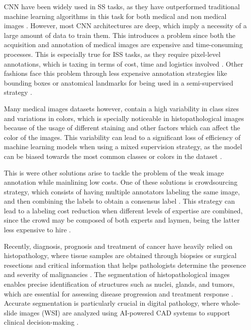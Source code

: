 \gls{CNN} have been widely used in \gls{SS} tasks, as they have outperformed
traditional machine learning algorithms in this task for both medical
and non medical images \cite{XuYan2024} \cite{Sarvamangala2022}.
However, most \gls{CNN} architectures are deep, which imply
a necessity of a large amount of data to train them. This introduces
a problem since both the acquisition and annotation of medical images
are expensive and time-consuming processes. This is especially true
for \gls{ISS} tasks, as they require pixel-level annotations, which
is taxing in terms of cost, time and logistics involved
\cite{Bhalgat2018}. Other fashions face this problem through less expensive
annotation strategies like bounding boxes or anatomical landmarks for
being used in a semi-supervised strategy \cite{Shah2018}.


Many medical images datasets however, contain a high variability in
class sizes and variations in colors, which is specially noticeable
in histopathological images because of the usage of different
staining and other factors which can affect the color of the images.
This variability can lead to a significant loss of efficiency of
machine learning models when using a mixed supervision strategy, as
the model can be biased towards the most common classes or colors in
the dataset \cite{Shah2018}.

This is were other solutions arise to tackle the problem of the weak
image annotation while mainlining low costs. One of these solutions
is crowdsourcing strategy, which consists of having multiple annotators
labeling the same image, and then combining the labels to obtain a
consensus label \cite{LuEtAl2023}. This strategy can lead to a
labeling cost reduction when different levels of expertise are
combined, since the crowd may be composed of both experts and laymen,
being the latter less expensive to hire \cite{Lopez2023}.

Recently, diagnosis, prognosis and treatment of cancer have heavily
relied on histopathology, where tissue samples are obtained through biopsies or
surgical resections and critical information that helps
pathologists determine the presence and severity of malignancies
\cite{LopezEtAl2024}. The segmentation of histopathological images
enables precise identification of structures such as nuclei, glands, and tumors,
which are essential for assessing disease progression and treatment
response \cite{Rashmi2021}. Accurate segmentation is particularly
crucial in digital pathology, where whole-slide images (\gls{WSI})
are analyzed using AI-powered \gls{CAD} systems to support
clinical decision-making \cite{LopezEtAl2024}.

